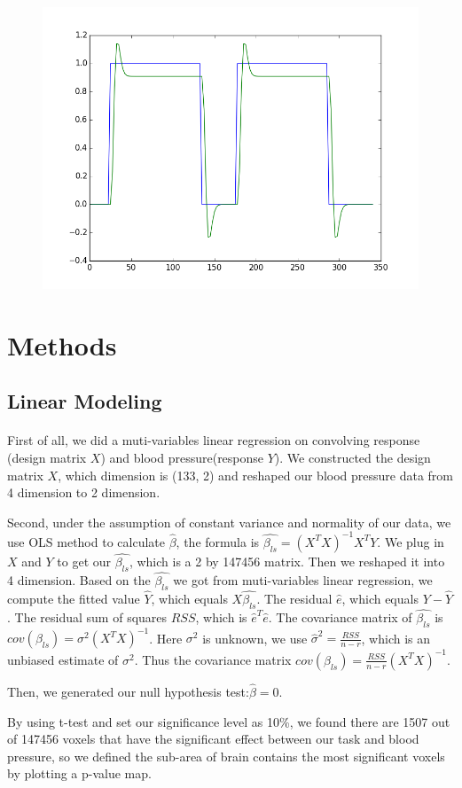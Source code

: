 \documentclass[11pt]{article}
\begin{document}
\begin{figure}[!htb]
    \includegraphics[width=\linewidth]{task001_run001_conv005}
\end{figure}

\section{Methods}
\subsection{Linear Modeling}
\paragraph{}
First of all, we did a muti-variables linear regression on convolving response 
(design matrix $X$) and blood pressure(response $Y$). We constructed the design 
matrix $X$, which dimension is (133, 2) and reshaped our blood pressure data from 
4 dimension to 2 dimension.\par
Second, under the assumption of constant variance and normality of our data, we 
use OLS method to calculate $\hat{\beta}$, the formula is 
$\hat{\beta_{ls}}=(X^{T}X)^{-1}X^{T}Y$. We plug in $X$ and $Y$ to get
our $\hat{\beta_{ls}}$, which is a 2 by 147456 matrix. Then we reshaped it into 
4 dimension. Based on the $\hat{\beta_{ls}}$ we got from muti-variables linear 
regression, we compute the fitted value $\hat{Y}$, which equals 
$X\hat{\beta_{ls}}$. The residual $\hat{e}$, which equals $Y-\hat{Y}$. The 
residual sum of squares $RSS$, which is $\hat{e}^{T}\hat{e}$. The covariance
matrix of $\hat{\beta_{ls}}$ is $cov(\beta_{ls}) = \sigma^2(X^{T}X)^{-1}$. Here $\sigma^2$
is unknown, we use $\hat{\sigma}^2 = \frac{RSS}{n-r}$, which is an unbiased 
estimate of $\sigma^2$. Thus the covariance matrix 
$cov(\beta_{ls}) = \frac{RSS}{n-r}(X^{T}X)^{-1}$. \par
Then, we generated our null hypothesis test:$\hat{\beta} = 0$.\par
By using t-test and set our significance level as 10\%, we found there are 1507 
out of 147456 voxels that have the significant effect between our task and 
blood pressure, so we defined the sub-area of brain contains the most 
significant voxels by plotting a p-value map.
\end{document}
